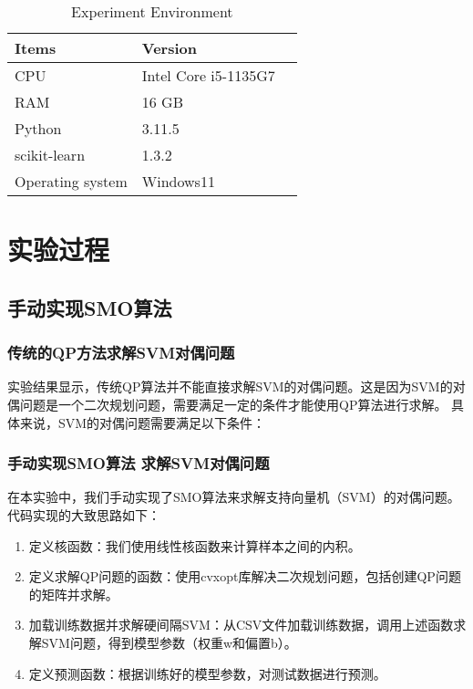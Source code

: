 \documentclass[12pt]{article}
\begin{document}
\begin{table}[!t]
  \caption{Experiment Environment}
  \label{tab:indicators}
  \centering
  \begin{tabular}{m{5cm}<{\centering}m{5cm}<{\centering}m{4cm}<{\centering}}
    \toprule
    \textbf{Items}   & \textbf{Version}     \\[\medskipamount]
    \midrule
    CPU              & Intel Core i5-1135G7 \\[\medskipamount]
    RAM              & 16 GB                \\[\medskipamount]
    Python           & 3.11.5               \\[\medskipamount]
    scikit-learn     & 1.3.2                \\[\medskipamount]
    Operating system & Windows11            \\[\medskipamount]
    \bottomrule
  \end{tabular}
\end{table}

\section{实验过程}
\subsection{手动实现SMO算法}

\subsubsection{传统的QP方法求解SVM对偶问题}
实验结果显示，传统QP算法并不能直接求解SVM的对偶问题。这是因为SVM的对偶问题是一个二次规划问题，需要满足一定的条件才能使用QP算法进行求解。
具体来说，SVM的对偶问题需要满足以下条件：

\subsubsection{手动实现SMO算法 求解SVM对偶问题}

在本实验中，我们手动实现了SMO算法来求解支持向量机（SVM）的对偶问题。代码实现的大致思路如下：
\begin{enumerate}
  \item 定义核函数：我们使用线性核函数来计算样本之间的内积。
  \item 定义求解QP问题的函数：使用cvxopt库解决二次规划问题，包括创建QP问题的矩阵并求解。
  \item 加载训练数据并求解硬间隔SVM：从CSV文件加载训练数据，调用上述函数求解SVM问题，得到模型参数（权重w和偏置b）。
  \item 定义预测函数：根据训练好的模型参数，对测试数据进行预测。
\end{enumerate}
\end{document}
